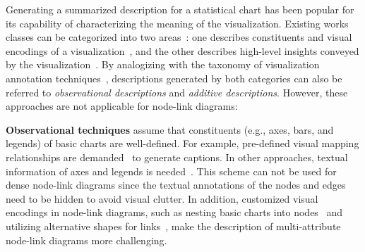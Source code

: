 Generating a summarized description for 
a statistical chart has been popular for its capability of characterizing the meaning of the visualization. 
Existing works 
classes 
can be categorized into two areas~\cite{DBLP:conf/inlg/ObeidH20}: one describes constituents and visual encodings of a  visualization~\cite{DBLP:journals/coling/MittalMCR98, DBLP:journals/tochi/FerresLST13}, and the other describes high-level insights conveyed by the visualization~\cite{DBLP:conf/apvis/LiuXHWY20, DBLP:conf/inlg/ObeidH20}. By analogizing with the taxonomy of visualization annotation techniques~\cite{DBLP:conf/chi/HullmanDA13}, descriptions generated by 
both 
categories 
can also be referred to \textit{observational descriptions} and \textit{additive descriptions}. 
However, these approaches are not applicable for node-link diagrams:

\textbf{Observational techniques} assume that constituents (e.g., axes, bars, and legends) of basic charts are well-defined. 
For example, 
pre-defined visual mapping relationships 
are demanded~\cite{DBLP:journals/coling/MittalMCR98} 
to generate captions.
In other approaches, textual information of axes and legends is needed~\cite{DBLP:conf/icip/ZhouT00, DBLP:conf/doceng/HuangT07, DBLP:conf/grec/HuangTL03}.
This scheme can not be used for dense node-link diagrams since the textual annotations of the nodes and edges need to be hidden to avoid visual clutter.
In addition, customized visual encodings in node-link diagrams, such as nesting basic charts into nodes~\cite{gehlenborg2010visualization, DBLP:conf/iv/JusufiDK10} and utilizing alternative shapes for links~\cite{DBLP:conf/iv/SchoffelSE16, DBLP:journals/tvcg/NielsenJBJ09}, make the description of multi-attribute node-link diagrams more challenging. 

